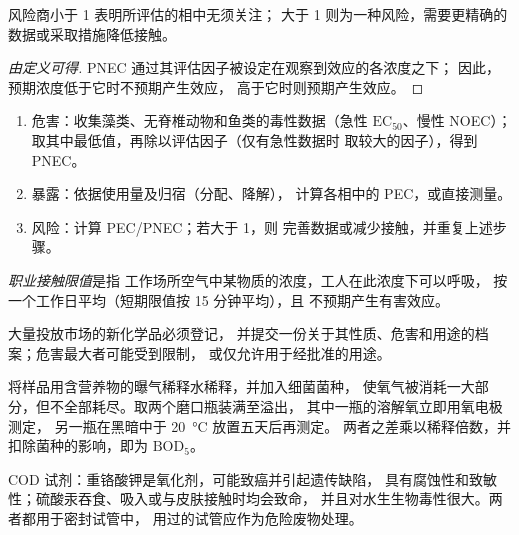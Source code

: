 \begin{proposition}[风险商]\label{prop:b3:environmental-toxicology:risk-quotient}
风险商小于 1 表明所评估的相中无须关注；
大于 1 则为一种风险，需要更精确的数据或采取措施降低接触。
\end{proposition}

\begin{proof}[由定义可得]
PNEC 通过其评估因子被设定在观察到效应的各浓度之下；
因此，预期浓度低于它时不预期产生效应，
高于它时则预期产生效应。
\end{proof}

\begin{method}[环境风险评估]\label{met:b3:environmental-toxicology:risk}
\begin{enumerate}
  \item 危害：收集藻类、无脊椎动物和鱼类的毒性数据（急性
        $\mathrm{EC_{50}}$、慢性 NOEC）；取其中最低值，再除以评估因子（仅有急性数据时
        取较大的因子），得到 PNEC。
  \item 暴露：依据使用量及归宿（分配、降解），
        计算各相中的 PEC，或直接测量。
  \item 风险：计算 PEC/PNEC；若大于 1，则
        完善数据或减少接触，并重复上述步骤。
\end{enumerate}
\end{method}

\begin{definition}[职业接触限值]\label{def:b3:environmental-toxicology:oel}
\emph{职业接触限值}是指
工作场所空气中某物质的浓度，工人在此浓度下可以呼吸，
按一个工作日平均（短期限值按 15 分钟平均），且
不预期产生有害效应。
\end{definition}

大量投放市场的新化学品必须登记，
并提交一份关于其性质、危害和用途的档案；危害最大者可能受到限制，
或仅允许用于经批准的用途。

\begin{inthelab}
将样品用含营养物的曝气稀释水稀释，并加入细菌菌种，
使氧气被消耗一大部分，但不全部耗尽。取两个磨口瓶装满至溢出，
其中一瓶的溶解氧立即用氧电极测定，
另一瓶在黑暗中于 \qty{20}{\celsius} 放置五天后再测定。
两者之差乘以稀释倍数，并扣除菌种的影响，即为
$\mathrm{BOD_5}$。
\end{inthelab}

\begin{safety}{}
COD 试剂：重铬酸钾是氧化剂，可能致癌并引起遗传缺陷，
具有腐蚀性和致敏性；硫酸汞吞食、吸入或与皮肤接触时均会致命，
并且对水生生物毒性很大。两者都用于密封试管中，
用过的试管应作为危险废物处理。
\end{safety}

